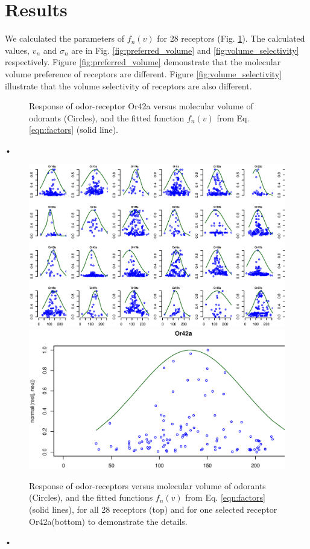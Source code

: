 \documentclass[11pt]{paper} %
\begin{document}
\section{Results}

We calculated the parameters of $f_n(v)$ for 28 receptors (Fig. \ref{fig:vol-res}). 
The calculated values, $v_n$ and $\sigma_n$ are in Fig. \ref{fig:preferred_volume} and \ref{fig:volume_selectivity} respectively.
Figure \ref{fig:preferred_volume} demonstrate that the molecular volume preference of receptors are different. 
Figure \ref{fig:volume_selectivity} illustrate that the volume selectivity of receptors are also different.


\begin{figure}

\caption{Response of odor-receptor Or42a  versus molecular volume of odorants (Circles), and the fitted function $f_n(v)$ from Eq. \ref{eqn:factors} (solid line).}

\end{figure}•

\begin{figure}
\centering
\includegraphics[width=\textwidth]{fig/vol-res}
\includegraphics[width=0.75 \textwidth]{fig/vol-res-Or42a}
\caption{Response of odor-receptors  versus molecular volume of odorants (Circles), and the fitted functions $f_n(v)$ from Eq. \ref{eqn:factors} (solid lines), 
for all 28 receptors (top) and for one selected receptor Or42a(bottom) to demonstrate the details. }
\label{fig:vol-res}
\end{figure}•
\end{document}
